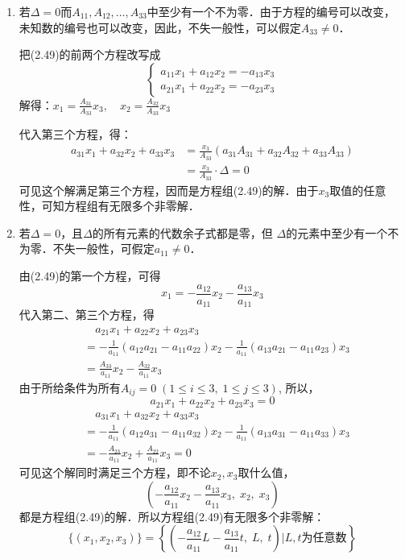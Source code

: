 \begin{enumerate}
    \item 若$\Delta=0$而$A_{11},A_{12},\ldots,A_{33}$中至少有一个不为零．由于方程的编号可以改变，未知数的编号也可以改变，因此，不失一般性，可以假定$A_{33}\ne 0$．
    
    把(2.49)的前两个方程改写成
\[\begin{cases}
    a_{11}x_1+a_{12}x_2=-a_{13}x_3\\
    a_{21}x_1+a_{22}x_2=-a_{23}x_3
\end{cases}\]
解得：$x_1=\frac{A_{31}}{A_{33}}x_3,\quad x_2=\frac{A_{32}}{A_{33}}x_3$

代入第三个方程，得：
\[\begin{split}
    a_{31}x_1+a_{32}x_2+a_{33}x_3&=\frac{x_3}{A_{33}}(a_{31}A_{31}+a_{32}A_{32}+a_{33}A_{33})\\
    &=\frac{x_3}{A_{33}}\cdot \Delta =0
\end{split}\]
可见这个解满足第三个方程，因而是方程组(2.49)的解．由于$x_3$取值的任意性，可知方程组有无限多个非零解．

\item 若$\Delta=0$，且$\Delta$的所有元素的代数余子式都是零，但
$\Delta$的元素中至少有一个不为零．不失一般性，可假定$a_{11}\ne 0$．

由(2.49)的第一个方程，可得
\[x_1=-\frac{a_{12}}{a_{11}}x_2-\frac{a_{13}}{a_{11}}x_3\]
代入第二、第三个方程，得
\[\begin{split}
   &\quad  a_{21}x_1+a_{22}x_2+a_{23}x_3\\
   &=-\frac{1}{a_{11}}(a_{12}a_{21}-a_{11}a_{22})x_2-\frac{1}{a_{11}}(a_{13}a_{21}-a_{11}a_{23})x_3\\
   &=\frac{A_{33}}{a_{11}}x_2-\frac{A_{32}}{a_{11}}x_3
\end{split}\]
由于所给条件为所有$A_{ij}=0\; (1\le i\le 3,\;  1\le j\le 3)$, 所以，
\[a_{21}x_1+a_{22}x_2+a_{23}x_3=0\]
\[\begin{split}
    &\quad a_{31}x_1+a_{32}x_2+a_{33}x_3\\
&=-\frac{1}{a_{11}}(a_{12}a_{31}-a_{11}a_{32})x_2-\frac{1}{a_{11}}(a_{13}a_{31}-a_{11}a_{33})x_3\\
&=-\frac{A_{23}}{a_{11}}x_2+\frac{A_{22}}{a_{11}}x_3=0
\end{split}\]
可见这个解同时满足三个方程，即不论$x_2,x_3$取什么值，$$\left(-\frac{a_{12}}{a_{11}}x_2-\frac{a_{13}}{a_{11}}x_3,\; x_2,\; x_3\right)$$
都是方程组(2.49)的解．所以方程组(2.49)有无限多个非零解：
\[\{(x_1,x_2,x_3)\}=\left\{\left(-\frac{a_{12}}{a_{11}}L-\frac{a_{13}}{a_{11}}t,\; L,\; t\right)\big| \text{$L,t$为任意数}\right\}\]
\end{enumerate}

